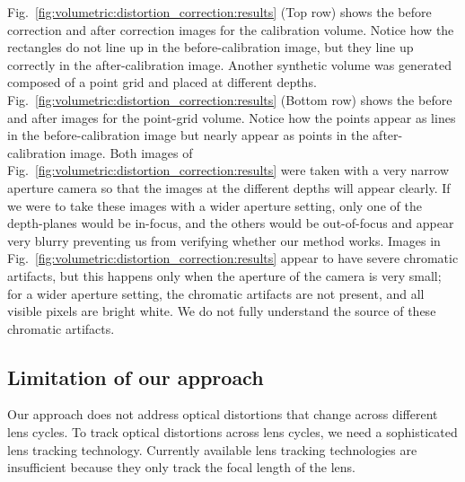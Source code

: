 Fig.~\ref{fig:volumetric:distortion_correction:results} (Top row) shows the before correction and after correction images for the calibration volume.
Notice how the rectangles do not line up in the before-calibration image, but they line up correctly in the after-calibration image. 
Another synthetic volume was generated composed of a point grid and placed at different depths. 
Fig.~\ref{fig:volumetric:distortion_correction:results} (Bottom row) shows the before and after images for the point-grid volume.
Notice how the points appear as lines in the before-calibration image but nearly appear as points in the after-calibration image.
Both images of Fig.~\ref{fig:volumetric:distortion_correction:results} were taken with a very narrow aperture camera so that the images at the different depths will appear clearly.
If we were to take these images with a wider aperture setting, only one of the depth-planes would be in-focus, and the others would be out-of-focus and appear very blurry preventing us from verifying whether our method works.
Images in Fig.~\ref{fig:volumetric:distortion_correction:results} appear to have severe chromatic artifacts, but this happens only when the aperture of the camera is very small; for a wider aperture setting, the chromatic artifacts are not present, and all visible pixels are bright white.
We do not fully understand the source of these chromatic artifacts. 

\subsection{Limitation of our approach}
Our approach does not address optical distortions that change across different lens cycles. To track optical distortions across lens cycles, we need a sophisticated lens tracking technology. Currently available lens tracking technologies are insufficient because they only track the focal length of the lens.
